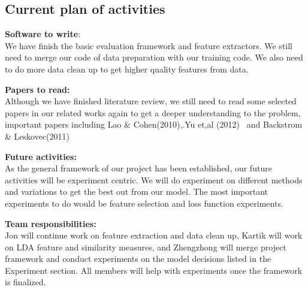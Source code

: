\documentclass{article} %
\begin{document}
\subsection{Current plan of activities}
\textbf{Software to write}:\\
We have finish the basic evaluation framework and feature extractors. We still need to merge 
our code of data preparation with our training code. We also need to do more data clean up to get
higher quality features from data.

\textbf{Papers to read:}\\
Although we have finished literature review, we still need to read some selected papers in our related works 
again to get a deeper understanding to the problem, important papers including Lao \& Cohen(2010),.Yu et,al (2012) \
and Backstrom \& Leskovec(2011)

\textbf{Future activities:}\\
As the general framework of our project has been established, our future activities will be experiment
centric. We will do experiment on different methods and variations to get the best out from our model. The
most important experiments to do would be feature selection and loss function experiments.

\textbf{Team responsibilities:}\\
Jon will continue work on feature extraction and data clean up, Kartik will work on LDA feature and similarity
measures, and Zhengzhong  will merge project framework and conduct experiments on the model decisions listed in
the Experiment section. All members will help with experiments once the framework is finalized.
\end{document}
